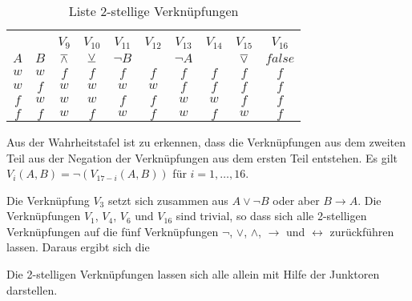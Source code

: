 \begin{Unit}
\begin{table}[htbp]
\begin{center}
\begin{tabular}{c|c||c|c|c|c|c|c|c|c}
 & & \hspace*{1.00cm} & \hspace*{1.00cm} & \hspace*{1.00cm} & 
  \hspace*{1.00cm} & \hspace*{1.00cm} & \hspace*{1.00cm} & 
  \hspace*{1.00cm} & \hspace*{1.00cm} \\
 & & $ V_9$ & $V_{10}$ & $V_{11}$ & $V_{12}$ & $V_{13}$ & $V_{14}$ & 
   $V_{15}$ & $V_{16}$ \\
$A$ & $B$ & $\operatorname{\overline{\wedge}}$ & $\operatorname{\underline{\vee}}$ & $\neg B$ & & $\neg A$ & & $\operatorname{\overline{\vee}}$ & $false$ \\
  \hline
  $w$  & $w$  & $f$  & $f$  & $f$  & $f$  & $f$  & $f$  & $f$  & $f$ \\
  $w$  & $f$  & $w$  & $w$  & $w$  & $w$  & $f$  & $f$  & $f$  & $f$ \\
  $f$  & $w$  & $w$  & $w$  & $f$  & $f$  & $w$  & $w$  & $f$  & $f$ \\
  $f$  & $f$  & $w$  & $f$  & $w$  & $f$  & $w$  & $f$  & $w$  & $f$ \\
\end{tabular}
  \caption{Liste 2-stellige Verknüpfungen}
  \label{tbl:Liste 2-stellige Verknüpfungen}
\end{center} 
\end{table}

Aus der Wahrheitstafel ist zu erkennen, dass die Verknüpfungen aus dem 
zweiten Teil aus der Negation der Verknüpfungen aus dem ersten Teil 
entstehen. Es gilt $V_i(A,B) = \neg(V_{17-i}(A,B))$ für 
$i = 1, \ldots, 16$.
\end{Unit}

\begin{Unit}[Bemerkung]
Die Verknüpfung $V_3$ setzt sich zusammen aus $A \lor \neg B$ oder aber 
$B \rightarrow A$. Die Verknüpfungen $V_1$, $V_4$, $V_6$ und $V_{16}$ sind 
trivial, so dass sich alle 2-stelligen Verknüpfungen auf die fünf 
Verknüpfungen $\neg$, $\lor$, $\land$, $\rightarrow$ und $\leftrightarrow$
zurückführen lassen. Daraus ergibt sich die

\begin{Bemerkung}
Die 2-stelligen Verknüpfungen lassen sich alle allein mit Hilfe der 
Junktoren darstellen.
\end{Bemerkung}
\end{Unit}

